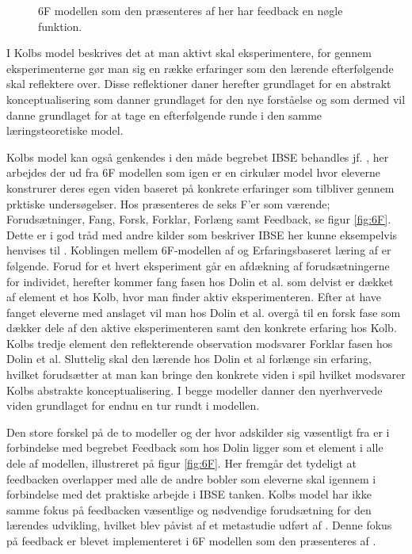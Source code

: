 \begin{figure}
	\centering
	\vspace{-20pt}
	\caption[6F modellen]{6F modellen som den præsenteres af \citep{Dolin2014} her har feedback en nøgle funktion. }
	\label{fig:6F}
\vspace{-20pt}
\end{figure}
\noindent I Kolbs model beskrives det at man aktivt skal eksperimentere, for gennem eksperimenterne gør man sig en række erfaringer som den lærende efterfølgende skal reflektere over. Disse reflektioner daner herefter grundlaget for en abstrakt konceptualisering som danner grundlaget for den nye forståelse og som dermed vil danne grundlaget for at tage en efterfølgende runde i den samme læringsteoretiske model. 

Kolbs model kan også genkendes i den måde begrebet IBSE behandles jf. \citep{Dolin2014}, her arbejdes der ud fra 6F modellen som igen er en  cirkulær model hvor eleverne konstrurer deres egen viden baseret på konkrete erfaringer som tilbliver gennem prktiske undersøgelser. Hos \citet{Dolin2014} præsenteres de seks F'er som værende; Forudsætninger, Fang, Forsk, Forklar, Forlæng samt Feedback, se figur \vref{fig:6F}. Dette er i god tråd med andre kilder som beskriver IBSE her kunne eksempelvis henvises til \citep{Krogh2016}.
Koblingen mellem 6F-modellen af \citep{Dolin2014} og Erfaringsbaseret læring af \citep{Kolb1984} er følgende. Forud for et hvert eksperiment går en afdækning af forudsætningerne for individet, herefter kommer fang fasen hos Dolin et al. som delvist er dækket af element et hos Kolb, hvor man finder aktiv eksperimenteren. Efter at have fanget eleverne med anslaget vil man hos Dolin et al. overgå til en forsk fase som dækker dele af den aktive eksperimenteren samt den konkrete erfaring hos Kolb. Kolbs tredje element den reflekterende observation modsvarer Forklar fasen hos Dolin et al. Sluttelig skal den lærende hos Dolin et al forlænge sin erfaring, hvilket forudsætter at man kan bringe den konkrete viden i spil hvilket modsvarer Kolbs abstrakte konceptualisering. I begge modeller danner den nyerhvervede viden grundlaget for endnu en tur rundt i modellen.


Den store forskel på de to modeller og der hvor \citet{Dolin2014} adskilder sig væsentligt fra \citet{Kolb1984} er i forbindelse med begrebet Feedback som hos Dolin ligger som et element i alle dele af modellen, illustreret på figur \vref{fig:6F}. Her fremgår det tydeligt at feedbacken overlapper med alle de andre bobler som eleverne skal igennem i forbindelse med det praktiske arbejde i IBSE tanken. Kolbs model har ikke samme fokus på feedbacken væsentlige og nødvendige forudsætning for den lærendes udvikling, hvilket blev påvist af et metastudie udført af \citep{Hattie2015}. Denne fokus på feedback er blevet implementeret i 6F modellen som den præsenteres af \citep{Dolin2014}.

